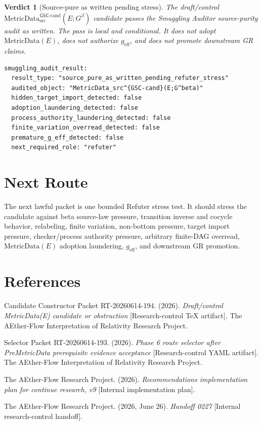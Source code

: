 \documentclass[11pt]{article}
\newcommand{\MetricData}{\mathrm{MetricData}_{\mathrm{src}}^{\mathsf{GSC}\mbox{-}\mathrm{cand}}}
\newcommand{\Gbeta}{G^\beta}
\newcommand{\geff}{g_{\mathrm{eff}}}
\newtheorem{verdict}{Verdict}
\begin{document}
\begin{verdict}[Source-pure as written pending stress]
The draft/control \(\MetricData(E;\Gbeta)\) candidate passes the Smuggling
Auditor source-purity audit as written. The pass is local and conditional. It
does not adopt \(\mathrm{MetricData}(E)\), does not authorize \(\geff\), and
does not promote downstream GR claims.
\end{verdict}

\begin{verbatim}
smuggling_audit_result:
  result_type: "source_pure_as_written_pending_refuter_stress"
  audited_object: "MetricData_src^{GSC-cand}(E;G^beta)"
  hidden_target_import_detected: false
  adoption_laundering_detected: false
  process_authority_laundering_detected: false
  finite_variation_overread_detected: false
  premature_g_eff_detected: false
  next_required_role: "refuter"
\end{verbatim}

\section{Next Route}

The next lawful packet is one bounded Refuter stress test. It should stress
the candidate against beta source-law pressure, transition inverse and
cocycle behavior, relabeling, finite variation, non-bottom pressure, target
import pressure, checker/process authority pressure, arbitrary finite-DAG
overread, \(\mathrm{MetricData}(E)\) adoption laundering, \(\geff\), and
downstream GR promotion.

\section{References}

Candidate Constructor Packet RT-20260614-194. (2026). \textit{Draft/control
MetricData(E) candidate or obstruction} [Research-control TeX artifact]. The
AEther-Flow Interpretation of Relativity Research Project.

Selector Packet RT-20260614-193. (2026). \textit{Phase 6 route selector after
PreMetricData prerequisite evidence acceptance} [Research-control YAML
artifact]. The AEther-Flow Interpretation of Relativity Research Project.

The AEther-Flow Research Project. (2026). \textit{Recommendations
implementation plan for continue research, v9} [Internal implementation
plan].

The AEther-Flow Research Project. (2026, June 26). \textit{Handoff 0227}
[Internal research-control handoff].
\end{document}
